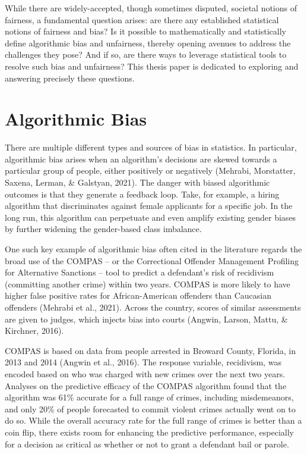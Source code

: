 \documentclass[12pt, twoside]{amherstthesis}
\begin{document}
While there are widely-accepted, though sometimes disputed, societal notions of fairness, a fundamental question arises: are there any established statistical notions of fairness and bias? Is it possible to mathematically and statistically define algorithmic bias and unfairness, thereby opening avenues to address the challenges they pose? And if so, are there ways to leverage statistical tools to resolve such bias and unfairness? This thesis paper is dedicated to exploring and answering precisely these questions.

\hypertarget{algbias}{%
\section{Algorithmic Bias}\label{algbias}}

There are multiple different types and sources of bias in statistics. In particular, algorithmic bias arises when an algorithm's decisions are skewed towards a particular group of people, either positively or negatively (Mehrabi, Morstatter, Saxena, Lerman, \& Galstyan, 2021). The danger with biased algorithmic outcomes is that they generate a feedback loop. Take, for example, a hiring algorithm that discriminates against female applicants for a specific job. In the long run, this algorithm can perpetuate and even amplify existing gender biases by further widening the gender-based class imbalance.

One such key example of algorithmic bias often cited in the literature regards the broad use of the COMPAS -- or the Correctional Offender Management Profiling for Alternative Sanctions -- tool to predict a defendant's risk of recidivism (committing another crime) within two years. COMPAS is more likely to have higher false positive rates for African-American offenders than Caucasian offenders (Mehrabi et al., 2021). Across the country, scores of similar assessments are given to judges, which injects bias into courts (Angwin, Larson, Mattu, \& Kirchner, 2016).

COMPAS is based on data from people arrested in Broward County, Florida, in 2013 and 2014 (Angwin et al., 2016). The response variable, recidivism, was encoded based on who was charged with new crimes over the next two years. Analyses on the predictive efficacy of the COMPAS algorithm found that the algorithm was 61\% accurate for a full range of crimes, including misdemeanors, and only 20\% of people forecasted to commit violent crimes actually went on to do so. While the overall accuracy rate for the full range of crimes is better than a coin flip, there exists room for enhancing the predictive performance, especially for a decision as critical as whether or not to grant a defendant bail or parole.
\end{document}
